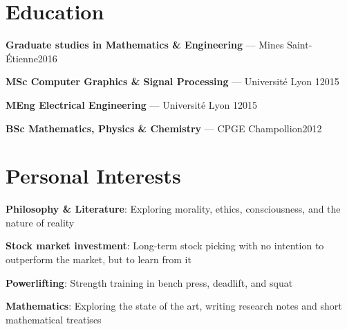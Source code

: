 \documentclass[10pt,a4paper]{article}
\newcommand{\entry}[2]{\textbf{#1}: #2\par}
\begin{document}
\section{Education}
\textbf{Graduate studies in Mathematics \& Engineering} --- Mines Saint-Étienne\hfill 2016\par
\textbf{MSc Computer Graphics \& Signal Processing} --- Université Lyon 1\hfill 2015\par
\textbf{MEng Electrical Engineering} --- Université Lyon 1\hfill 2015\par
\textbf{BSc Mathematics, Physics \& Chemistry} --- CPGE Champollion\hfill 2012\par
\section{Personal Interests}
\entry{Philosophy \& Literature}{Exploring morality, ethics, consciousness, and the nature of reality}
\entry{Stock market investment}{Long-term stock picking with no intention to outperform the market, but to learn from it}
\entry{Powerlifting}{Strength training in bench press, deadlift, and squat}
\entry{Mathematics}{Exploring the state of the art, writing research notes and short mathematical treatises}
\end{document}
